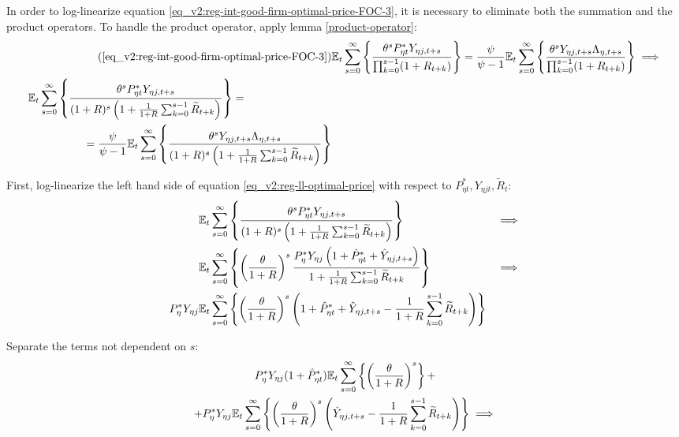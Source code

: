 \documentclass[../thesis.tex]{subfiles}
\begin{document}
In order to log-linearize equation \ref{eq_v2:reg-int-good-firm-optimal-price-FOC-3}, it is necessary to eliminate both the summation and the product operators. To handle the product operator, apply lemma \ref{product-operator}:
\begin{align}
	\tag{\ref{eq_v2:reg-int-good-firm-optimal-price-FOC-3}}
	& \E \sum_{s=0}^{\infty} \left\{ \frac{\theta^s P_{\eta t}^{\ast} Y_{\eta j,t+s}}{ \prod_{k=0}^{s-1}(1+R_{t+k})} \right\} = \frac{\psi}{\psi-1} \E \sum_{s=0}^{\infty} \left\{ \frac{\theta^s Y_{\eta j,t+s} \Lambda_{\eta, t+s}}{\prod_{k=0}^{s-1}(1+R_{t+k})} \right\} \implies
	\\
	\begin{split}
		& \E \sum_{s=0}^{\infty} \left\{ \frac{\theta^s P_{\eta t}^{\ast} Y_{\eta j,t+s}}{ (1 + R)^s \left( 1 + \frac{1}{1 + R} \sum_{k=0}^{s-1} \widetilde{R}_{t+k} \right)} \right\} = 
		\\ & \quad \quad \quad \quad \quad = \frac{\psi}{\psi-1} \E \sum_{s=0}^{\infty} \left\{ \frac{\theta^s Y_{\eta j,t+s} \Lambda_{\eta, t+s}}{ (1 + R)^s \left( 1 + \frac{1}{1 + R} \sum_{k=0}^{s-1} \widetilde{R}_{t+k} \right)} \right\} \label{eq_v2:reg-ll-optimal-price}
	\end{split}
\end{align}

First, log-linearize the left hand side of equation \ref{eq_v2:reg-ll-optimal-price} with respect to \( P_{\eta t}^{\ast}, Y_{\eta j t}, \widetilde{R}_t \):
\begin{alignat}{2}
	& {\mathbb{E}_{t}} \sum_{s=0}^{\infty} \left\{ \frac{\theta^s P_{\eta t}^{\ast} Y_{\eta j,t+s}}{ (1 + R)^s \left( 1 + \frac{1}{1 + R} \sum_{k=0}^{s-1} \widetilde{R}_{t+k} \right)} \right\} &\implies \nonumber \\
	& {\mathbb{E}_{t}} \sum_{s=0}^{\infty} \left\{ \left( \frac{\theta}{1 + R} \right)^s  \frac{ P_{\eta}^{\ast} Y_{\eta j} \left( 1 + \hat{P}_{\eta t}^{\ast} + \hat{Y}_{\eta j, t+s} \right)}{ 1 + \frac{1}{1 + R} \sum_{k=0}^{s-1} \widetilde{R}_{t+k}} \right\} &\implies \nonumber \\
	P_{\eta}^{\ast} Y_{\eta j} &{\mathbb{E}_{t}} \sum_{s=0}^{\infty} \left\{ \left( \frac{\theta}{1 + R} \right)^s \left( 1 + \hat{P}_{\eta t}^{\ast} + \hat{Y}_{\eta j, t+s} - \frac{1}{1 + R} \sum_{k=0}^{s-1} \widetilde{R}_{t+k} \right) \right\} & \nonumber
\end{alignat}

Separate the terms not dependent on $s$:
\begin{multline}
	P_{\eta}^{\ast} Y_{\eta j} ( 1 + \hat{P}_{\eta t}^{\ast} ) {\mathbb{E}_{t}} \sum_{s=0}^{\infty} \left\{ \left( \frac{\theta}{1 + R} \right)^s \right\} + \\
	+ P_{\eta}^{\ast} Y_{\eta j} {\mathbb{E}_{t}} \sum_{s=0}^{\infty} \left\{ \left( \frac{\theta}{1 + R} \right)^s \left( \hat{Y}_{\eta j, t+s} - \frac{1}{1 + R} \sum_{k=0}^{s-1} \widetilde{R}_{t+k} \right) \right\} \implies \nonumber
\end{multline}
\end{document}
